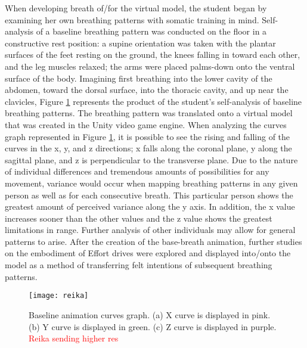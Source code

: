 \documentclass[arts,article,submit,moreauthors,pdftex,10pt,a4paper]{mdpi}
\begin{document}
	When developing breath of/for the virtual model, the student began by examining her own breathing patterns with somatic training in mind. Self-analysis of a baseline breathing pattern was conducted on the floor in a constructive rest position: a supine orientation was taken with the plantar surfaces of the feet resting on the ground, the knees falling in toward each other, and the leg muscles relaxed; the arms were placed palms-down onto the ventral surface of the body. Imagining first breathing into the lower cavity of the abdomen, toward the dorsal surface, into the thoracic cavity, and up near the clavicles, {Figure \ref{reika} represents the product of the student’s self-analysis of baseline breathing patterns. The breathing pattern was translated onto a virtual model that was created in the Unity video game engine. 
When analyzing the curves graph represented in Figure \ref{reika},} it is possible to see the rising and falling of the curves in the x, y, and z directions; x falls along the coronal plane, y along the sagittal plane, and z is perpendicular to the transverse plane. Due to the nature of individual differences and tremendous amounts of possibilities for any movement, variance would occur when mapping breathing patterns in any given person as well as for each consecutive breath. This particular person shows the greatest amount of perceived variance along the y axis. In addition, the x value increases sooner than the other values and the z value shows the greatest limitations in range. Further analysis of other individuals may allow for general patterns to arise. After the creation of the base-breath animation, further studies on the embodiment of Effort drives were explored and displayed into/onto the model as a method of transferring felt intentions of subsequent breathing patterns.

\begin{figure}[h!]
\centering
\vspace{-.1in}
\texttt{[image: reika]}
\caption{Baseline animation curves graph. (a) X curve is displayed in pink. (b) Y curve is displayed in green. (c) Z curve is displayed in purple. \textcolor{red}{Reika sending higher res}}
\label{reika}
\end{figure}
\end{document}
